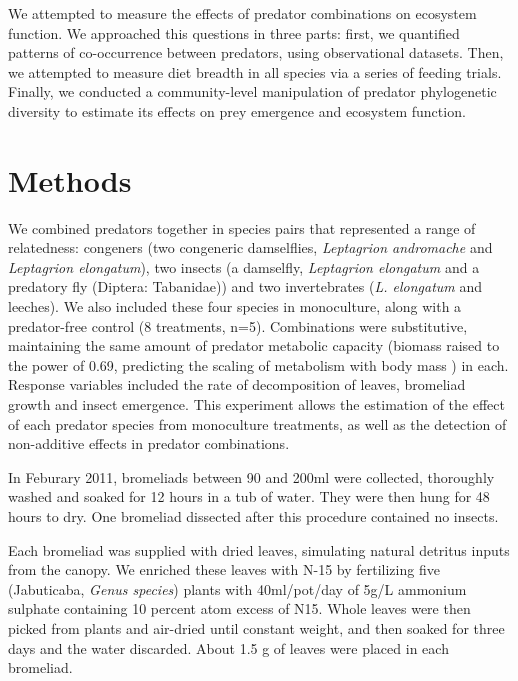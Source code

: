 \documentclass[10pt]{article}
\begin{document}
\begin{spacing}{2}
We attempted to measure the effects of predator combinations on
ecosystem function.  We approached this questions in three parts:
first, we quantified patterns of co-occurrence between predators, using
observational datasets.  Then, we attempted to measure diet breadth in
all species via a series of feeding trials.  Finally, we conducted a
community-level manipulation of predator phylogenetic diversity to
estimate its effects on prey emergence and ecosystem function.

\section{Methods}



We combined predators together in species pairs that represented a
range of relatedness: congeners (two congeneric damselflies,
\emph{Leptagrion andromache} and \emph{Leptagrion elongatum}), two
insects (a damselfly, \emph{Leptagrion elongatum} and a predatory fly
(Diptera: Tabanidae)) and two invertebrates (\emph{L. elongatum} and
leeches).  We also included these four species in monoculture, along
with a predator-free control (8 treatments, n=5).  Combinations were
substitutive, maintaining the same amount of predator metabolic
capacity (biomass raised to the power of 0.69, predicting the scaling
of metabolism with body mass \citep{Brown2004}) in each.  Response
variables included the rate of decomposition of leaves, bromeliad
growth and insect emergence.  This experiment allows the estimation of
the effect of each predator species from monoculture treatments, as
well as the detection of non-additive effects in predator
combinations.

In Feburary 2011, bromeliads between 90 and 200ml were collected,
thoroughly washed and soaked for 12 hours in a tub of water.  They
were then hung for 48 hours to dry.  One bromeliad dissected after
this procedure contained no insects.

Each bromeliad was supplied with dried leaves, simulating natural
detritus inputs from the canopy.  We enriched these leaves with N-15
by fertilizing five (Jabuticaba, \emph{Genus species}) plants with
40ml/pot/day of 5g/L ammonium sulphate containing 10 percent atom
excess of N15. %
Whole leaves were then picked from plants and air-dried until constant
weight, and then soaked for three days and the water discarded.  About
1.5 g of leaves were placed in each bromeliad.


\end{spacing}
\end{document}
